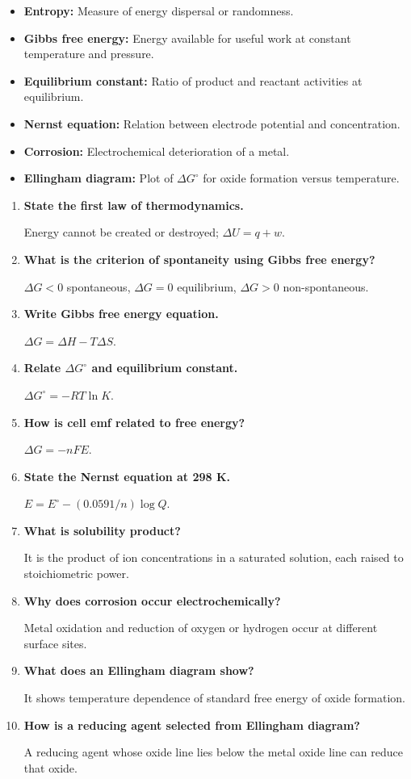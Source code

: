 \documentclass[12pt,a4paper]{article}
\newcommand{\Q}[1]{\textbf{#1}\par\noindent\ignorespaces}
\begin{document}
\begin{tcolorbox}[defbox, title={One-Line Definitions}]
\begin{itemize}[leftmargin=*, itemsep=2pt, topsep=2pt]
  \item \textbf{Entropy:} Measure of energy dispersal or randomness.
  \item \textbf{Gibbs free energy:} Energy available for useful work at constant temperature and pressure.
  \item \textbf{Equilibrium constant:} Ratio of product and reactant activities at equilibrium.
  \item \textbf{Nernst equation:} Relation between electrode potential and concentration.
  \item \textbf{Corrosion:} Electrochemical deterioration of a metal.
  \item \textbf{Ellingham diagram:} Plot of $\Delta G^\circ$ for oxide formation versus temperature.
\end{itemize}
\end{tcolorbox}

\begin{tcolorbox}[exambox, title={Frequently Asked / Viva Questions}]
\begin{enumerate}[topsep=0pt, label=\textbf{Q\arabic*.}, itemsep=5pt]
  \item \Q{State the first law of thermodynamics.}
    Energy cannot be created or destroyed; $\Delta U=q+w$.
  \item \Q{What is the criterion of spontaneity using Gibbs free energy?}
    $\Delta G<0$ spontaneous, $\Delta G=0$ equilibrium, $\Delta G>0$ non-spontaneous.
  \item \Q{Write Gibbs free energy equation.}
    $\Delta G=\Delta H-T\Delta S$.
  \item \Q{Relate $\Delta G^\circ$ and equilibrium constant.}
    $\Delta G^\circ=-RT\ln K$.
  \item \Q{How is cell emf related to free energy?}
    $\Delta G=-nFE$.
  \item \Q{State the Nernst equation at 298 K.}
    $E=E^\circ-(0.0591/n)\log Q$.
  \item \Q{What is solubility product?}
    It is the product of ion concentrations in a saturated solution, each raised to stoichiometric power.
  \item \Q{Why does corrosion occur electrochemically?}
    Metal oxidation and reduction of oxygen or hydrogen occur at different surface sites.
  \item \Q{What does an Ellingham diagram show?}
    It shows temperature dependence of standard free energy of oxide formation.
  \item \Q{How is a reducing agent selected from Ellingham diagram?}
    A reducing agent whose oxide line lies below the metal oxide line can reduce that oxide.
\end{enumerate}
\end{tcolorbox}
\end{document}
